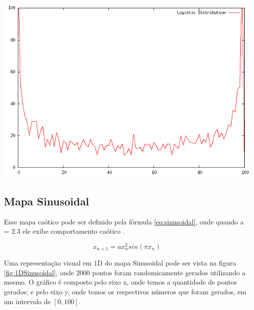{
    \centering
    \includegraphics[width=0.6\linewidth]{figuras/DistribuicaoLogistica.png}
    \label{fig:1DLogistico}
}



\subsection{Mapa Sinusoidal}

Esse mapa caótico pode ser definido pela fórmula \ref{eq:sinusoidal}, onde quando a = 2.3 ele exibe comportamento caótico \cite{gandomi}.

\begin{equation}
\label{eq:sinusoidal}
x_{n + 1} = a x_{n}^{2} sin(\pi x_{n})
\end{equation}

Uma representação visual em 1D do mapa Sinusoidal pode ser vista na figura \ref{fig:1DSinusoidal}, onde 2000 pontos foram randomicamente gerados utilizando a mesmo. O gráfico é composto pelo eixo x, onde temos a quantidade de pontos gerados; e pelo eixo y, onde temos os respectivos números que foram gerados, em um intervalo de $[0, 100]$.

